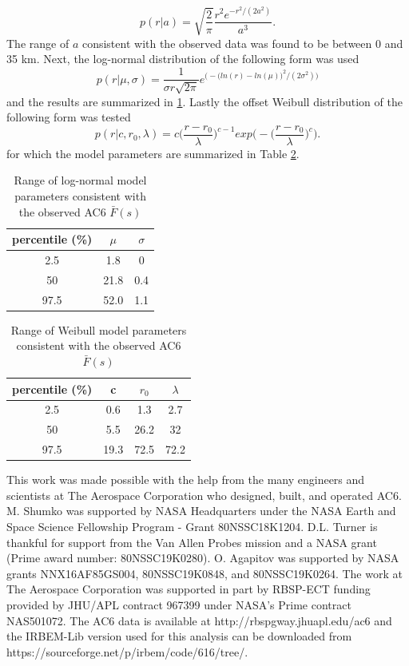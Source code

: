 \documentclass[draft]{agujournal2019}
\begin{document}
\begin{equation}
p(r | a) = \sqrt{\frac{2}{\pi}} \frac{r^2 e^{-r^2/(2a^2)}}{a^3}.
\end{equation} The range of $a$ consistent with the observed data was found to be between 0 and 35 km. Next, the log-normal distribution of the following form was used
\begin{equation}
p(r | \mu, \sigma) = \frac{1}{\sigma r \sqrt{2 \pi}} e^{\Big( -\big( ln(r) - ln(\mu) \big)^2/(2 \sigma^2) \Big)}
\end{equation} and the results are summarized in \ref{table_s1}. Lastly the offset Weibull distribution of the following form was tested
\begin{equation}
p(r | c, r_0, \lambda) = c \bigg(\frac{r-r_0}{\lambda}\bigg)^{c-1} exp \Bigg(- \bigg(\frac{r-r_0}{\lambda}\bigg)^{c} \Bigg).
\end{equation} for which the model parameters are summarized in Table \ref{table_s2}.

\begin{table}[h]
\caption{Range of log-normal model parameters consistent with the observed AC6  $\bar{F}(s)$}
\label{table_s1}
\centering
\begin{tabular}{|c|c|c|}
\hline 
percentile (\%) & $\mu$ & $\sigma$ \\ 
\hline 
2.5 & 1.8 & 0 \\ 
\hline 
50 & 21.8 & 0.4 \\ 
\hline 
97.5 & 52.0 & 1.1 \\ 
\hline 
\end{tabular} 
\end{table}

\begin{table}[h]
\caption{Range of Weibull model parameters consistent with the observed AC6  $\bar{F}(s)$}
\label{table_s2}
\centering
\begin{tabular}{|c|c|c|c|}
\hline 
percentile (\%) & c & $r_0$ & $\lambda$ \\ 
\hline 
2.5 & 0.6 & 1.3 & 2.7 \\ 
\hline 
50 & 5.5 & 26.2 & 32 \\ 
\hline 
97.5 & 19.3 & 72.5 & 72.2 \\ 
\hline 
\end{tabular} 
\end{table}

\acknowledgments
This work was made possible with the help from the many engineers and scientists at The Aerospace Corporation who designed, built, and operated AC6. M. Shumko was supported by NASA Headquarters under the NASA Earth and Space Science Fellowship Program - Grant 80NSSC18K1204. D.L. Turner is thankful for support from the Van Allen Probes mission and a NASA grant (Prime award number: 80NSSC19K0280). O. Agapitov was supported by NASA grants NNX16AF85GS004, 80NSSC19K0848, and 80NSSC19K0264. The work at The Aerospace Corporation was supported in part by RBSP-ECT funding provided by JHU/APL contract 967399 under NASA's Prime contract NAS501072. The AC6 data is available at http://rbspgway.jhuapl.edu/ac6 and the IRBEM-Lib version used for this analysis can be downloaded from https://sourceforge.net/p/irbem/code/616/tree/.


%
\end{document}
